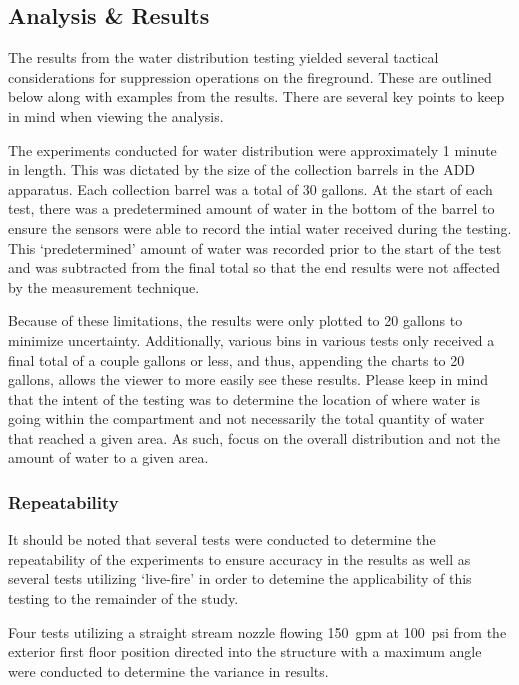 \documentclass{article}
\begin{document}
\clearpage

\subsection{Analysis \& Results}

The results from the water distribution testing yielded several tactical considerations for suppression operations on the fireground. These are outlined below along with examples from the results. There are several key points to keep in mind when viewing the analysis. 

The experiments conducted for water distribution were approximately 1 minute in length. This was dictated by the size of the collection barrels in the ADD apparatus. Each collection barrel was a total of 30 gallons. At the start of each test, there was a predetermined amount of water in the bottom of the barrel to ensure the sensors were able to record the intial water received during the testing. This `predetermined' amount of water was recorded prior to the start of the test and was subtracted from the final total so that the end results were not affected by the measurement technique. 

Because of these limitations, the results were only plotted to 20 gallons to minimize uncertainty. Additionally, various bins in various tests only received a final total of a couple gallons or less, and thus, appending the charts to 20 gallons, allows the viewer to more easily see these results. Please keep in mind that the intent of the testing was to determine the location of where water is going within the compartment and not necessarily the total quantity of water that reached a given area. As such, focus on the overall distribution and not the amount of water to a given area.

\subsubsection{Repeatability}

It should be noted that several tests were conducted to determine the repeatability of the experiments to ensure accuracy in the results as well as several tests utilizing `live-fire' in order to detemine the applicability of this testing to the remainder of the study.

Four tests utilizing a straight stream nozzle flowing 150~gpm at 100~psi from the exterior first floor position directed into the structure with a maximum angle were conducted to determine the variance in results.
\end{document}
